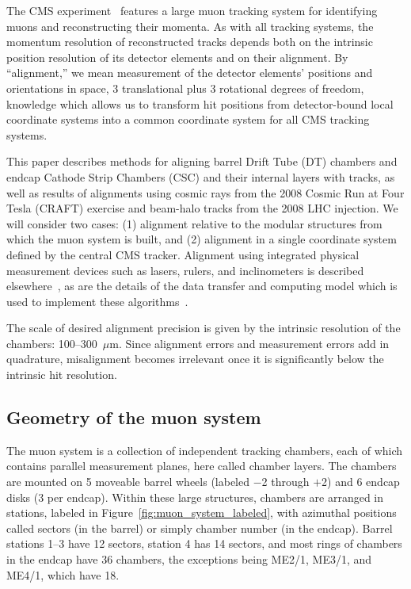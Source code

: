  

The CMS experiment~\cite{ref:cms} features a large muon tracking system for
identifying muons and reconstructing their momenta.  As with all
tracking systems, the momentum resolution of reconstructed tracks depends both
on the intrinsic position resolution of its detector elements and on their
alignment.  By ``alignment,'' we mean measurement of the detector
elements' positions and orientations in space, 3 translational plus 3
rotational degrees of freedom, knowledge which allows us to transform
hit positions from detector-bound local coordinate systems into a
common coordinate system for all CMS tracking systems.

This paper describes methods for aligning barrel Drift Tube (DT)
chambers and endcap Cathode Strip Chambers (CSC) and their internal
layers with tracks, as well as results of alignments using cosmic rays
from the 2008 Cosmic Run at Four Tesla (CRAFT) exercise
and beam-halo tracks from the 2008 LHC injection.  We will consider two
cases: (1) alignment relative to the modular structures from which the
muon system is built, and (2) alignment in a single coordinate system
defined by the central CMS tracker.  Alignment using integrated
physical measurement devices such as lasers, rulers, and
inclinometers is described elsewhere~\cite{ref:hardware_alignment}, as
are the details of the data transfer and computing model which is used
to implement these algorithms~\cite{ref:workflow}.

The scale of desired alignment precision is given by the intrinsic
resolution of the chambers: 100--300~$\mu$m.  Since alignment errors
and measurement errors add in quadrature, misalignment becomes
irrelevant once it is significantly below the intrinsic hit
resolution.

\subsection{Geometry of the muon system}

The muon system is a collection of independent tracking chambers, each
of which contains parallel measurement planes, here called chamber layers.  The
chambers are mounted on 5 moveable barrel wheels (labeled $-$2 through
$+$2) and 6 endcap disks (3 per endcap).  Within these large
structures, chambers are arranged in stations, labeled in
Figure~\ref{fig:muon_system_labeled}, with azimuthal positions called
sectors (in the barrel) or simply chamber number (in the endcap).  Barrel
stations 1--3 have 12 sectors, station 4 has 14 sectors, and most
rings of chambers in the endcap have 36 chambers, the exceptions being
ME2/1, ME3/1, and ME4/1, which have 18.

